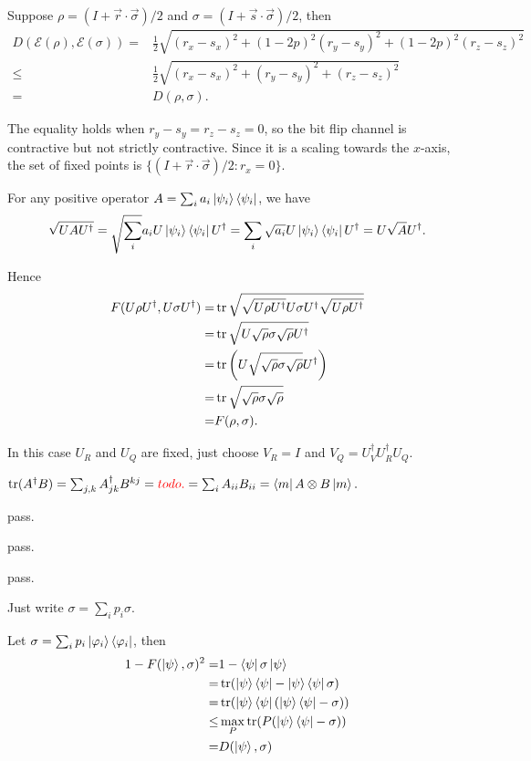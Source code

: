 \ex Suppose $\rho=(I+\vec{r}\cdot\vec{\sigma})/2$ and $\sigma=(I+\vec{s}\cdot\vec{\sigma})/2$, then
$$\begin{aligned}
D(\mathcal{E}(\rho), \mathcal{E}(\sigma))
= & \frac{1}{2}\sqrt{(r_x-s_x)^2+(1-2p)^2(r_y-s_y)^2+(1-2p)^2(r_z-s_z)^2}
\\ \le & \frac{1}{2}\sqrt{(r_x-s_x)^2+(r_y-s_y)^2+(r_z-s_z)^2}
\\ = & D(\rho, \sigma).
\end{aligned}$$

The equality holds when $r_y-s_y=r_z-s_z=0$, so the bit flip channel is contractive but not strictly contractive.
Since it is a scaling towards the $x$-axis, the set of fixed points is $\{(I+\vec{r}\cdot\vec{\sigma})/2:r_x=0\}$.

\ex For any positive operator $A=\sum_ia_i\left|\psi_i\right\rangle\left\langle\psi_i\right|$, we have
$$
\sqrt{UAU^\dagger}
= \sqrt{\sum_i}a_iU\left|\psi_i\right\rangle\left\langle\psi_i\right|U^\dagger
= \sum_i\sqrt{a_i}U\left|\psi_i\right\rangle\left\langle\psi_i\right|U^\dagger
= U\sqrt{A}U^\dagger.
$$

Hence
$$\begin{aligned}
F(U\rho U^\dagger, U\sigma U^\dagger)
= & \operatorname{tr}\sqrt{\sqrt{U\rho U^\dagger}U\sigma U^\dagger\sqrt{U\rho U^\dagger}}
\\ = & \operatorname{tr}\sqrt{U\sqrt{\rho}\sigma\sqrt{\rho}U^\dagger}
\\ = & \operatorname{tr}\left(U\sqrt{\sqrt{\rho}\sigma\sqrt{\rho}}U^\dagger\right)
\\ = & \operatorname{tr}\sqrt{\sqrt{\rho}\sigma\sqrt{\rho}}
\\ = & F(\rho, \sigma).
\end{aligned}$$

\ex In this case $U_R$ and $U_Q$ are fixed, just choose $V_R=I$ and $V_Q=U_V^\dagger U_R^\dagger U_Q$.

\ex $\operatorname{tr}(A^\dagger B) = \sum_{j,k}A^\dagger_{jk}B^{kj} = {\color{red}{todo.}} = \sum_iA_{ii}B_{ii} = \left\langle m\right|A\otimes B\left|m\right\rangle.$

\ex pass.

\ex pass.

\ex pass.

\ex Just write $\sigma=\sum_ip_i\sigma$.

\ex Let $\sigma=\sum_ip_i\left|\varphi_i\right\rangle\left\langle\varphi_i\right|$, then
$$\begin{aligned}
1 - F(\left|\psi\right\rangle, \sigma)^2
= & 1 - \left\langle\psi\right|\sigma\left|\psi\right\rangle
\\ = & \operatorname{tr}(\left|\psi\right\rangle\left\langle\psi\right|-\left|\psi\right\rangle\left\langle\psi\right|\sigma)
\\ = & \operatorname{tr}(\left|\psi\right\rangle\left\langle\psi\right|(\left|\psi\right\rangle\left\langle\psi\right|-\sigma))
\\ \le & \max_P\operatorname{tr}(P(\left|\psi\right\rangle\left\langle\psi\right|-\sigma))
\\ = & D(\left|\psi\right\rangle, \sigma)
\end{aligned}$$